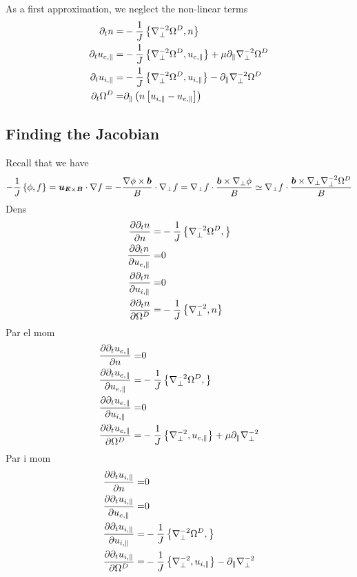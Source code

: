 As a first approximation, we neglect the non-linear terms
\begin{align*}
 \partial_t n
 =&
 -\frac{1}{J}\L\{\grad_\perp^{-2}\Om^D,n\R\}
\\
%
%
%
\partial_t u_{e,\|}
 =&
 -\frac{1}{J}\L\{\grad_\perp^{-2}\Om^D,u_{e,\|}\R\}
 + \mu \partial_\| \grad_\perp^{-2}\Om^D
\\
%
%
%
\partial_t u_{i,\|}
 =&
 -\frac{1}{J}\L\{\grad_\perp^{-2}\Om^D, u_{i,\|}\R\}
 - \partial_\|\grad_\perp^{-2}\Om^D
\\
%
%
%
  \partial_t \Om^D
  =&
  \partial_\| \L(n\L[ u_{i,\|} - u_{e,\|} \R]\R)
\end{align*}
\subsection{Finding the Jacobian}
Recall that we have
%
\begin{align*}
-\frac{1}{J}\left\{\phi,f\right\}
= \boldsymbol{u}_{\boldsymbol{E}\times\boldsymbol{B}}\cdot\nabla f
= -\frac{\nabla\phi\times\boldsymbol{b}}{B}\cdot\nabla_\perp f
= \nabla_\perp f\cdot\frac{\boldsymbol{b}\times\nabla_\perp\phi}{B}
\simeq \nabla_\perp f\cdot\frac{\boldsymbol{b}\times\nabla_\perp\nabla_\perp^{-2}\Omega^D}{B}
\end{align*}
%
Dens
\begin{align*}
 \frac{\partial { \partial_t n }}{\partial{n}} =& -\frac{1}{J}\left\{\nabla_\perp^{-2}\Omega^D,\right\} \\
 \frac{\partial { \partial_t n }}{\partial{u_{e,\|}}} =& 0 \\
 \frac{\partial { \partial_t n }}{\partial{u_{i,\|}}} =& 0 \\
 \frac{\partial { \partial_t n }}{\partial{\Omega^D}} =& -\frac{1}{J}\left\{\nabla_\perp^{-2},n\right\}
\end{align*}
Par el mom
\begin{align*}
    \frac{\partial { \partial_t u_{e,\|} }}{\partial{ n }} =& 0\\
    \frac{\partial { \partial_t u_{e,\|} }}{\partial{u_{e,\|}}} =&
    -\frac{1}{J}\left\{\nabla_\perp^{-2}\Omega^D,\right\}\\
    \frac{\partial { \partial_t u_{e,\|} }}{\partial{ u_{i,\| } }}=& 0\\
    \frac{\partial { \partial_t u_{e,\|} }}{\partial{ \Omega^D }} =&
    -\frac{1}{J}\left\{\nabla_\perp^{-2},u_{e,\|}\right\} + \mu \partial_\|
    \nabla_\perp^{-2}
\end{align*}
Par i mom
\begin{align*}
    \parti{\partial_t u_{i,\|}}{n} =& 0 \\
%
\parti{\partial_t u_{i,\|}}{u_{e,\|}} =& 0\\
%
    \parti{\partial_t u_{i,\|}}{u_{i,\|}} =&
    -\frac{1}{J}\L\{\grad_\perp^{-2}\Om^D,\R\} \\
%
    \parti{\partial_t u_{i,\|}}{\Om^D} =&
    -\frac{1}{J}\L\{\grad_\perp^{-2},u_{i,\|}\R\} -
    \partial_\|\grad_\perp^{-2}
\end{align*}
